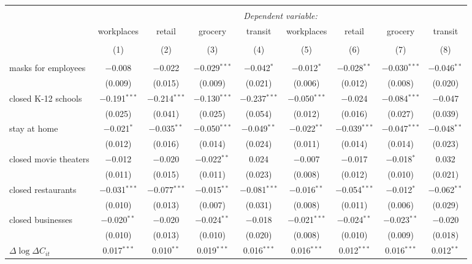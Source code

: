 \begin{tabular}{@{\extracolsep{1pt}}lcccccccc} 
\\[-1.8ex]\hline 
\hline \\[-1.8ex] 
 & \multicolumn{8}{c}{\textit{Dependent variable:}} \\ 
\cline{2-9} 
 & workplaces & retail & grocery & transit & workplaces & retail & grocery & transit \\ 
\\[-1.8ex] & (1) & (2) & (3) & (4) & (5) & (6) & (7) & (8)\\ 
\hline \\[-1.8ex] 
 masks for employees & $-$0.008 & $-$0.022 & $-$0.029$^{***}$ & $-$0.042$^{*}$ & $-$0.012$^{*}$ & $-$0.028$^{**}$ & $-$0.030$^{***}$ & $-$0.046$^{**}$ \\ 
  & (0.009) & (0.015) & (0.009) & (0.021) & (0.006) & (0.012) & (0.008) & (0.020) \\ 
  closed K-12 schools & $-$0.191$^{***}$ & $-$0.214$^{***}$ & $-$0.130$^{***}$ & $-$0.237$^{***}$ & $-$0.050$^{***}$ & $-$0.024 & $-$0.084$^{***}$ & $-$0.047 \\ 
  & (0.025) & (0.041) & (0.025) & (0.054) & (0.012) & (0.016) & (0.027) & (0.039) \\ 
  stay at home & $-$0.021$^{*}$ & $-$0.035$^{**}$ & $-$0.050$^{***}$ & $-$0.049$^{**}$ & $-$0.022$^{**}$ & $-$0.039$^{***}$ & $-$0.047$^{***}$ & $-$0.048$^{**}$ \\ 
  & (0.012) & (0.016) & (0.014) & (0.024) & (0.011) & (0.014) & (0.014) & (0.023) \\ 
  closed movie theaters & $-$0.012 & $-$0.020 & $-$0.022$^{**}$ & 0.024 & $-$0.007 & $-$0.017 & $-$0.018$^{*}$ & 0.032 \\ 
  & (0.011) & (0.015) & (0.011) & (0.023) & (0.008) & (0.012) & (0.010) & (0.021) \\ 
  closed restaurants & $-$0.031$^{***}$ & $-$0.077$^{***}$ & $-$0.015$^{**}$ & $-$0.081$^{***}$ & $-$0.016$^{**}$ & $-$0.054$^{***}$ & $-$0.012$^{*}$ & $-$0.062$^{**}$ \\ 
  & (0.010) & (0.013) & (0.007) & (0.031) & (0.008) & (0.011) & (0.006) & (0.029) \\ 
  closed businesses & $-$0.020$^{**}$ & $-$0.020 & $-$0.024$^{**}$ & $-$0.018 & $-$0.021$^{***}$ & $-$0.024$^{**}$ & $-$0.023$^{**}$ & $-$0.020 \\ 
  & (0.010) & (0.013) & (0.010) & (0.020) & (0.008) & (0.010) & (0.009) & (0.018) \\ 
  $\Delta \log \Delta C_{it}$ & 0.017$^{***}$ & 0.010$^{**}$ & 0.019$^{***}$ & 0.016$^{***}$ & 0.016$^{***}$ & 0.012$^{***}$ & 0.016$^{***}$ & 0.012$^{**}$ \\ 

\end{tabular}
